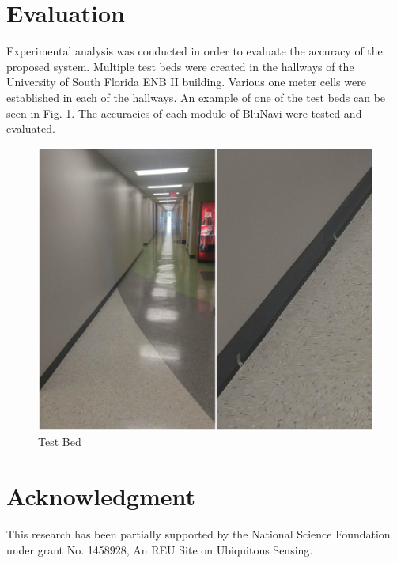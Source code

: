 \documentclass[conference]{IEEEtran}
\begin{document}
\section{Evaluation}

Experimental analysis was conducted in order to evaluate the accuracy of the proposed system. Multiple test beds were created in the hallways of the University of South Florida ENB II building. Various one meter cells were established in each of the hallways. An example of one of the test beds can be seen in Fig. \ref{fig:testbed}. The accuracies of each module of BluNavi were tested and evaluated.

\begin{figure}[h]
\centering
\includegraphics[scale=0.25]{TestbedCollage.png}
\caption{Test Bed}
\captionsetup{justification=centering,margin=2cm}
\label{fig:testbed}
\end{figure}

\section*{Acknowledgment}
This research has been partially supported by the National Science Foundation under grant No. 1458928, An REU Site on Ubiquitous Sensing.




\end{document}
